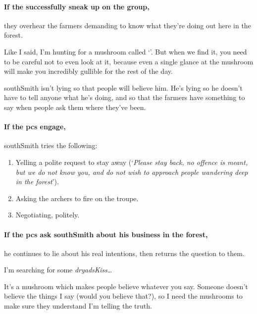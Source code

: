 \paragraph{If the successfully sneak up on the group,}
they overhear the farmers demanding to know what they're doing out here in the forest.

\null
\begin{speechtext}
  Like I said, I'm hunting for a mushroom called `'.
  But when we find it, you need to be careful not to even look at it, because even a single glance at the mushroom will make you incredibly gullible for the rest of the day.
\end{speechtext}

\Gls{southSmith} isn't lying so that people will believe him.
He's lying so he doesn't have to tell anyone what he's doing, and so that the farmers have something to say when people ask them where they've been.


\paragraph{If the \glspl{pc} engage,}

\Gls{southSmith} tries the following:

\begin{enumerate}
  \item
  Yelling a polite request to stay away (`\textit{Please stay back, no offence is meant, but we do not know you, and do not wish to approach people wandering deep in the forest}').
  \item
  Asking the archers to fire on the troupe.
  \item
  Negotiating, politely.
\end{enumerate}

\paragraph{If the \glspl{pc} ask \gls{southSmith} about his business in the forest,}
he continues to lie about his real intentions, then returns the question to them.

\begin{speechtext}
  I'm searching for some \textit{\gls{dryadsKiss}}\ldots

  It's a mushroom which makes people believe whatever you say.
  Someone doesn't believe the things I say (would you believe that?), so I need the mushrooms to make sure they understand I'm telling the truth.
\end{speechtext}

